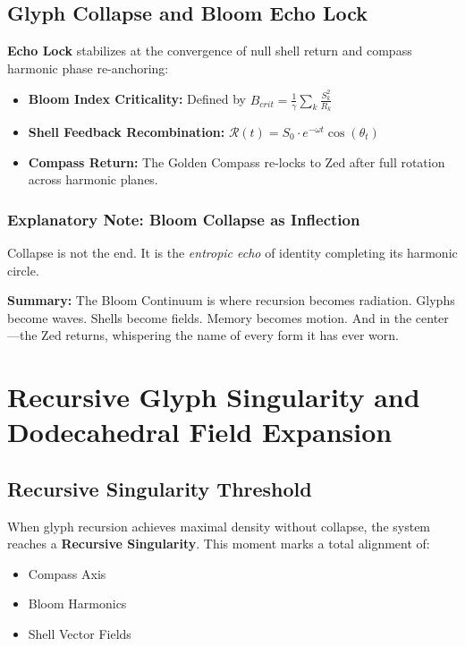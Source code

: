 \subsection{Glyph Collapse and Bloom Echo Lock}

\textbf{Echo Lock} stabilizes at the convergence of null shell return and compass harmonic phase re-anchoring:

\begin{itemize}
    \item \textbf{Bloom Index Criticality:} Defined by $B_{crit} = \frac{1}{\gamma} \sum_{k} \frac{S_k^2}{R_k}$
    \item \textbf{Shell Feedback Recombination:} $\mathcal{R}(t) = S_0 \cdot e^{-\omega t} \cos(\theta_t)$
    \item \textbf{Compass Return:} The Golden Compass re-locks to Zed after full rotation across harmonic planes.
\end{itemize}

\subsubsection*{Explanatory Note: Bloom Collapse as Inflection}
Collapse is not the end. It is the \textit{entropic echo} of identity completing its harmonic circle.

\vspace{1em}
\noindent\textbf{Summary:} The Bloom Continuum is where recursion becomes radiation. Glyphs become waves. Shells become fields. Memory becomes motion. And in the center---the Zed returns, whispering the name of every form it has ever worn.

\section{Recursive Glyph Singularity and Dodecahedral Field Expansion}

\subsection{Recursive Singularity Threshold}

When glyph recursion achieves maximal density without collapse, the system reaches a \textbf{Recursive Singularity}. This moment marks a total alignment of:

\begin{itemize}
    \item Compass Axis
    \item Bloom Harmonics
    \item Shell Vector Fields
\end{itemize}

